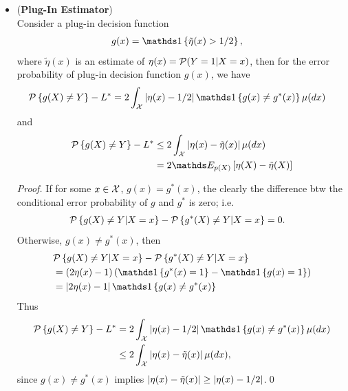 \documentclass[11pt]{article}
\begin{document}
\begin{itemize}
\item \begin{proposition} \label{prop: plug_in_deviation} (\textbf{Plug-In Estimator}) \citep{devroye2013probabilistic}\\
Consider a plug-in decision function 
\begin{align*}
g(x) &= \ind{\tilde{\eta}(x)>1/2},
\end{align*}
where $\tilde{\eta}(x)$ is an estimate of $\eta(x)= {\mathcal P}(Y=1| X=x)$, then for the error probability of plug-in decision function  $g(x)$, we have
\begin{align}
\cP\set{g(X)\neq Y} - L^{*} &= 2\int_{\cX}\abs{\eta(x)- 1/2}\ind{g(x)\neq g^{*}(x)}\mu(dx) \label{expr: Bayes_excess_plug_in}
\end{align}
and 
\begin{align}
\cP\set{g(X)\neq Y} - L^{*} &\le 2\int_{\cX}\abs{\eta(x)- \tilde{\eta}(x)}\mu(dx) \nonumber\\
& = 2\E{p(X)}{\eta(X)- \tilde{\eta}(X)}  \label{expr: Bayes_excess_plug_in_2}
\end{align}
\end{proposition}
\begin{proof}
If for some $x\in {\mathcal X}$, $g(x)= g^{*}(x)$, the clearly the difference btw the conditional error probability of $g$ and $g^{*}$ is zero; i.e. 
\begin{align*}
{\mathcal P}\left\{g(X)\neq Y| X=x\right\} - {\mathcal P}\left\{g^{*}(X)\neq Y| X=x\right\}  &= 0.
\end{align*}
Otherwise, $g(x)\neq g^{*}(x)$, then 
\begin{align*}
&\cP\set{g(X)\neq Y| X=x} - \cP\set{g^{*}(X)\neq Y| X=x}  \\
&= (2\eta(x)-1)\paren{ \ind{g^{*}(x)=1} -  \ind{g(x)=1}  }\\
&= \abs{2\eta(x)-1}\ind{g(x)\neq g^{*}(x)}
\end{align*}
Thus
\begin{align*}
\cP\set{g(X)\neq Y} - L^{*} &=2 \int_{\cX}\abs{\eta(x)-1/2}\ind{g(x)\neq g^{*}(x)}\mu(dx)\\
&\le 2 \int_{\cX}\abs{\eta(x)- \tilde{\eta}(x)}\mu(dx),
\end{align*}
since $g(x)\neq g^{*}(x)$ implies $\left\lvert \eta(x)- \tilde{\eta}(x) \right\rvert\ge \left\lvert \eta(x)-1/2 \right\rvert$.\qed 
\end{proof}


\end{itemize}
\end{document}
